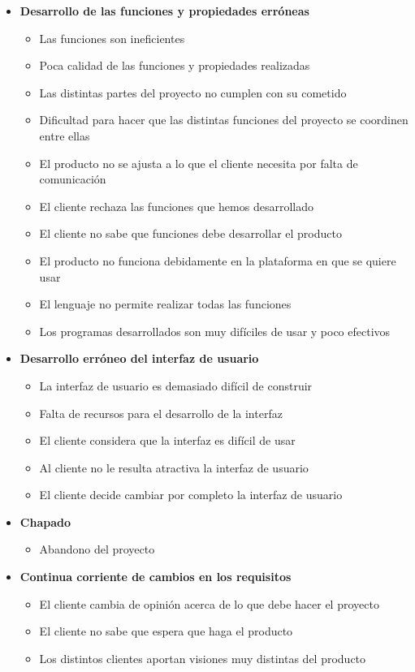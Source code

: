 \documentclass[spanish,a4paper,11pt, twoside]{report}	%
\begin{document}
\begin{itemize}
\begin{itemize}
	\end{itemize}
\item \textbf {Desarrollo de las funciones y propiedades erróneas}
	\begin{itemize}
		\item {Las funciones son ineficientes}
		\item {Poca calidad de las funciones y propiedades realizadas}
		\item {Las distintas partes del proyecto no cumplen con su cometido}
		\item {Dificultad para hacer que las distintas funciones del proyecto se coordinen entre ellas}
		\item {El producto no se ajusta a lo que el cliente necesita por falta de comunicación}
		\item {El cliente rechaza las funciones que hemos desarrollado}
		\item {El cliente no sabe que funciones debe desarrollar el producto}
		\item {El producto no funciona debidamente en la plataforma en que se quiere usar}
		\item {El lenguaje no permite realizar todas las funciones}
		\item {Los programas desarrollados son muy difíciles de usar y poco efectivos}	
	\end{itemize}
\item \textbf {Desarrollo erróneo del interfaz de usuario}
	\begin{itemize}
		\item {La interfaz de usuario es demasiado difícil de construir}
		\item {Falta de recursos para el desarrollo de la interfaz}
		\item {El cliente considera que la interfaz es difícil de usar}
		\item {Al cliente no le resulta atractiva la interfaz de usuario}
		\item {El cliente decide cambiar por completo la interfaz de usuario}
	\end{itemize}
\item \textbf {Chapado}
	\begin{itemize}
		\item {Abandono del proyecto}
	\end{itemize}
\item \textbf {Continua corriente de cambios en los requisitos}
	\begin{itemize}
		\item {El cliente cambia de opinión acerca de lo que debe hacer el proyecto}
		\item {El cliente no sabe que espera que haga el producto}
		\item {Los distintos clientes aportan visiones muy distintas del producto}


\end{itemize}
\end{itemize}
\end{document}
